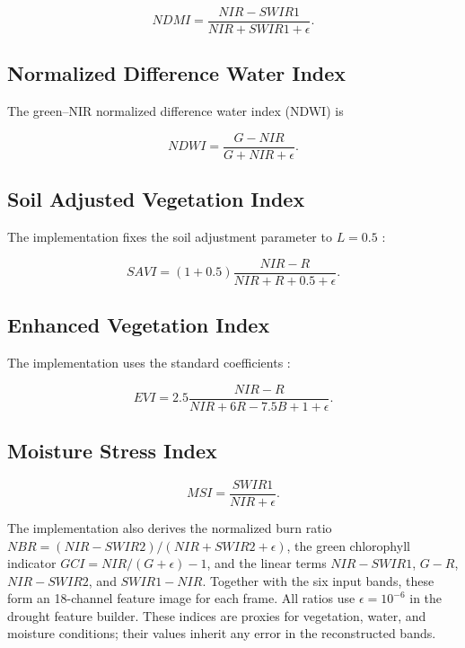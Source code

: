 \documentclass[11pt,a4paper]{article}
\begin{document}
\begin{equation}
NDMI
=
\frac{
NIR-SWIR1
}{
NIR+SWIR1+\epsilon
}.
\end{equation}

\subsection{Normalized Difference Water Index}

The green--NIR normalized difference water index (NDWI)
\cite{mcfeeters1996} is

\begin{equation}
NDWI
=
\frac{
G-NIR
}{
G+NIR+\epsilon
}.
\end{equation}

\subsection{Soil Adjusted Vegetation Index}

The implementation fixes the soil adjustment parameter to $L=0.5$
\cite{huete1988}:

\begin{equation}
SAVI
=
\left(1+0.5\right)
\frac{
NIR-R
}{
NIR+R+0.5+\epsilon
}.
\end{equation}

\subsection{Enhanced Vegetation Index}

The implementation uses the standard coefficients
\cite{huete2002}:

\begin{equation}
EVI
=
2.5
\frac{
NIR-R
}{
NIR+6R-7.5B+1+\epsilon
}.
\end{equation}

\subsection{Moisture Stress Index}

\begin{equation}
MSI
=
\frac{
SWIR1
}{
NIR+\epsilon
}.
\end{equation}

The implementation also derives the normalized burn ratio
$NBR=(NIR-SWIR2)/(NIR+SWIR2+\epsilon)$, the green chlorophyll
indicator $GCI=NIR/(G+\epsilon)-1$, and the linear terms
$NIR-SWIR1$, $G-R$, $NIR-SWIR2$, and $SWIR1-NIR$. Together with the
six input bands, these form an 18-channel feature image for each frame.
All ratios use $\epsilon=10^{-6}$ in the drought feature builder.
These indices are proxies for vegetation, water, and moisture
conditions; their values inherit any error in the reconstructed bands.
\end{document}
